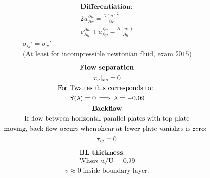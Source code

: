 \documentclass[10pt, a4paper]{article}
\newcommand{\derivative}[2]{\frac{\partial #1}{\partial #2}}
\begin{document}
\begin{gather*}
    \textbf{Differentiation:} \\
    2u\derivative{u}{x} = \derivative{(u)^2}{x} \\
    v\derivative{u}{y} + u\derivative{v}{y} = \derivative{(uv)}{y}
\end{gather*}
\begin{gather*}
    \sigma_{ij}' = \sigma_{ji}' \\
    \text{(At least for incompressible newtonian fluid, exam 2015)}
\end{gather*}
\begin{gather*}
    \textbf{Flow separation} \\
    \tau_{w}\arrowvert_{xs} = 0 \\
    \text{For Twaites this corresponds to: } \\
    S(\lambda) = 0 \implies \lambda = -0.09 \\
    \textbf{Backflow} \\
    \text{If flow between horizontal parallel plates with top plate} \\
    \text{moving, back flow occurs when shear at lower plate vanishes is zero: } \\
    \tau_{w} = 0
\end{gather*}
\begin{gather*}
    \textbf{BL thickness:} \\
    \text{Where u/U = 0.99}
\end{gather*}
\begin{gather*}
    \text{$v \approx 0$ inside boundary layer.}
\end{gather*}
\end{document}
